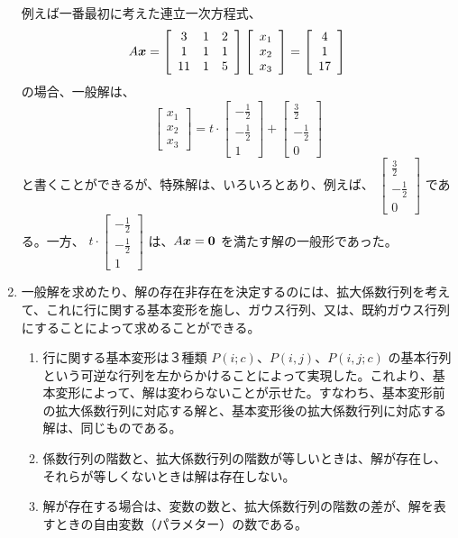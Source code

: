 \begin{enumerate}
\smallskip
例えば一番最初に考えた連立一次方程式、
$$A\mbox{\boldmath $x$} = \left[\begin{array}{ccc}3 & 1 & 2\\1 & 1 & 1\\ 11 & 1 & 5\end{array}\right]\left[\begin{array}{c}x_1\\
x_2 \\
x_3\end{array}\right] = 
\left[\begin{array}{c}4 \\1\\ 17\end{array}\right]$$
の場合、一般解は、
$$\left[\begin{array}{r}
x_1 \\ x_2 \\x_3 
\end{array}\right] =
t\cdot \left[\begin{array}{r}
-\frac12 \\ -\frac12 \\ 1
\end{array}\right]  + 
\left[\begin{array}{r}
\frac32 \\ -\frac12 \\ 0 
\end{array}\right] $$
と書くことができるが、特殊解は、いろいろとあり、例えば、
${\displaystyle \left[\begin{array}{r}
\frac32 \\ -\frac12 \\ 0 
\end{array}\right] }$
である。一方、
${\displaystyle t\cdot \left[\begin{array}{r}
-\frac12 \\ -\frac12 \\ 1
\end{array}\right] }$ 
は、$A\mbox{\boldmath $x$} = \mbox{\boldmath $0$}$ を満たす解の一般形であった。

\item 一般解を求めたり、解の存在非存在を決定するのには、拡大係数行列を考えて、これに行に関する基本変形を施し、ガウス行列、又は、既約ガウス行列にすることによって求めることができる。
	\begin{enumerate}
	\item 行に関する基本変形は３種類 $P(i;c)$、$P(i,j)$、$P(i,j;c)$ の基本行列という可逆な行列を左からかけることによって実現した。これより、基本変形によって、解は変わらないことが示せた。すなわち、基本変形前の拡大係数行列に対応する解と、基本変形後の拡大係数行列に対応する解は、同じものである。
	\item 係数行列の階数と、拡大係数行列の階数が等しいときは、解が存在し、それらが等しくないときは解は存在しない。
	\item 解が存在する場合は、変数の数と、拡大係数行列の階数の差が、解を表すときの自由変数（パラメター）の数である。
	\end{enumerate}
	

\end{enumerate}
